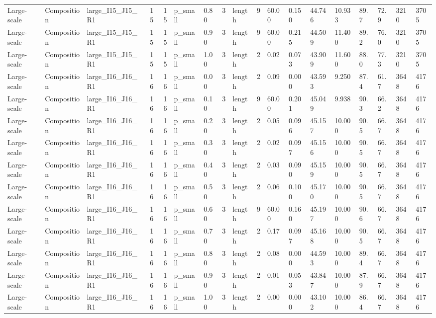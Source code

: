 \begin{longtable}{lllrrllllrllllllll}
Large-scale & Composition & large\_I15\_J15\_R1 & 15 & 15 & p\_small & 0.80 & 3 & length & 9 & 60.00 & 0.150 & 44.746 & 10.933 & 89.7 & 72.9 & 3210 & 3705 \\
Large-scale & Composition & large\_I15\_J15\_R1 & 15 & 15 & p\_small & 0.90 & 3 & length & 9 & 60.00 & 0.215 & 44.509 & 11.400 & 89.2 & 76.0 & 3210 & 3705 \\
Large-scale & Composition & large\_I15\_J15\_R1 & 15 & 15 & p\_small & 1.00 & 3 & length & 2 & 0.02 & 0.073 & 43.909 & 11.600 & 88.0 & 77.3 & 3210 & 3705 \\
Large-scale & Composition & large\_I16\_J16\_R1 & 16 & 16 & p\_small & 0.00 & 3 & length & 2 & 0.09 & 0.000 & 43.593 & 9.250 & 87.4 & 61.7 & 3648 & 4176 \\
Large-scale & Composition & large\_I16\_J16\_R1 & 16 & 16 & p\_small & 0.10 & 3 & length & 9 & 60.00 & 0.201 & 45.049 & 9.938 & 90.3 & 66.2 & 3648 & 4176 \\
Large-scale & Composition & large\_I16\_J16\_R1 & 16 & 16 & p\_small & 0.20 & 3 & length & 2 & 0.05 & 0.096 & 45.157 & 10.000 & 90.5 & 66.7 & 3648 & 4176 \\
Large-scale & Composition & large\_I16\_J16\_R1 & 16 & 16 & p\_small & 0.30 & 3 & length & 2 & 0.02 & 0.097 & 45.156 & 10.000 & 90.5 & 66.7 & 3648 & 4176 \\
Large-scale & Composition & large\_I16\_J16\_R1 & 16 & 16 & p\_small & 0.40 & 3 & length & 2 & 0.03 & 0.090 & 45.159 & 10.000 & 90.5 & 66.7 & 3648 & 4176 \\
Large-scale & Composition & large\_I16\_J16\_R1 & 16 & 16 & p\_small & 0.50 & 3 & length & 2 & 0.06 & 0.100 & 45.170 & 10.000 & 90.5 & 66.7 & 3648 & 4176 \\
Large-scale & Composition & large\_I16\_J16\_R1 & 16 & 16 & p\_small & 0.60 & 3 & length & 9 & 60.00 & 0.160 & 45.197 & 10.000 & 90.6 & 66.7 & 3648 & 4176 \\
Large-scale & Composition & large\_I16\_J16\_R1 & 16 & 16 & p\_small & 0.70 & 3 & length & 2 & 0.17 & 0.097 & 45.168 & 10.000 & 90.5 & 66.7 & 3648 & 4176 \\
Large-scale & Composition & large\_I16\_J16\_R1 & 16 & 16 & p\_small & 0.80 & 3 & length & 2 & 0.08 & 0.000 & 44.593 & 10.000 & 89.4 & 66.7 & 3648 & 4176 \\
Large-scale & Composition & large\_I16\_J16\_R1 & 16 & 16 & p\_small & 0.90 & 3 & length & 2 & 0.01 & 0.053 & 43.847 & 10.000 & 87.9 & 66.7 & 3648 & 4176 \\
Large-scale & Composition & large\_I16\_J16\_R1 & 16 & 16 & p\_small & 1.00 & 3 & length & 2 & 0.00 & 0.000 & 43.102 & 10.000 & 86.4 & 66.7 & 3648 & 4176 \\

\end{longtable}
